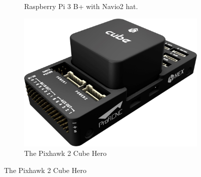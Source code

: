 \begin{itemize}
\begin{figure}[ht]
\begin{subfigure}[b]{0.3\textwidth}
            \caption[Raspberry Pi 3 B+ with Navio2 hat.]{Raspberry Pi 3 B+ with Navio2 hat.\footnotemark}
            \label{subfig:navio2_rpi_3}
        \end{subfigure}
        \hspace{1cm}
        \begin{subfigure}[b]{0.3\textwidth}
            \centering
            \includegraphics[width=\textwidth]{images/pixhawk2_cube_hero.png}
            \caption[The Pixhawk 2 Cube Hero]{The Pixhawk 2 Cube Hero\footnotemark}
            \label{fig:pixhawk_2_cube_hero}
        \end{subfigure}
    \end{figure}
    

\end{itemize}

